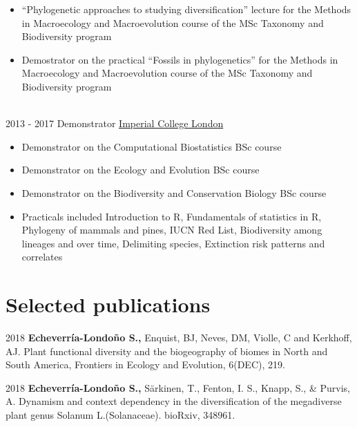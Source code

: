 \documentclass[letterpaper]{twentysecondcv} %
\begin{document}
\begin{twenty}
{{\begin{itemize}
        \item ``Phylogenetic approaches to studying diversification'' lecture for the Methods in Macroecology and Macroevolution course of the MSc Taxonomy and Biodiversity program
        \item Demostrator on the practical ``Fossils in phylogenetics'' for the Methods in Macroecology and Macroevolution course of the MSc Taxonomy and Biodiversity program
    \end{itemize}}
	}
    \\   
	\twentyitem
	{2013 - }
	{2017}
	{Demonstrator}
	{\href{https://www.imperial.ac.uk/}{Imperial College London}}
	{}
	{
	 {\begin{itemize}
		\item Demonstrator on the Computational Biostatistics BSc course
		\item Demonstrator on the Ecology and Evolution BSc course
		\item Demonstrator on the Biodiversity and Conservation Biology BSc course
		\item Practicals included Introduction to R, Fundamentals of statistics in R, Phylogeny of mammals and pines, IUCN Red List, Biodiversity among lineages and over time, Delimiting species, Extinction risk patterns and correlates
		
	\end{itemize}}
    	}
        
\end{twenty}


\section{Selected publications}

2018 \textbf{Echeverr\'ia-Londo\~no S.,} Enquist, BJ, Neves, DM, Violle, C and Kerkhoff, AJ.  Plant functional diversity and the biogeography of biomes in North and South America, Frontiers in Ecology and Evolution, 6(DEC), 219.

2018 \textbf{Echeverr\'ia-Londo\~no S.,}  S{\"a}rkinen, T., Fenton, I. S., Knapp, S., \& Purvis, A. Dynamism and context dependency in the diversification of the megadiverse plant genus Solanum L.(Solanaceae). bioRxiv, 348961.
\end{document}

